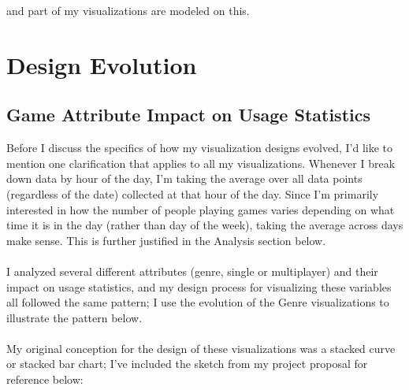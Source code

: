 \documentclass[pdftex,12pt,a4paper]{article}
\begin{document}
and part of my visualizations are modeled on this. 

\section{Design Evolution}
\subsection{Game Attribute Impact on Usage Statistics}
Before I discuss the specifics of how my visualization designs evolved, I'd like to mention one clarification that applies to all my visualizations. Whenever I break down data by hour of the day, I'm taking the average over all data points (regardless of the date) collected at that hour of the day. Since I'm primarily interested in how the number of people playing games varies depending on what time it is in the day (rather than day of the week), taking the average across days make sense. This is further justified in the Analysis section below. \\ \\
I analyzed several different attributes (genre, single or multiplayer) and their impact on usage statistics, and my design process for visualizing these variables all followed the same pattern; I use the evolution of the Genre visualizations to illustrate the pattern below. \\ \\
My original conception for the design of these visualizations was a stacked curve or stacked bar chart; I've included the sketch from my project proposal for reference below: \\ \\
\end{document}
